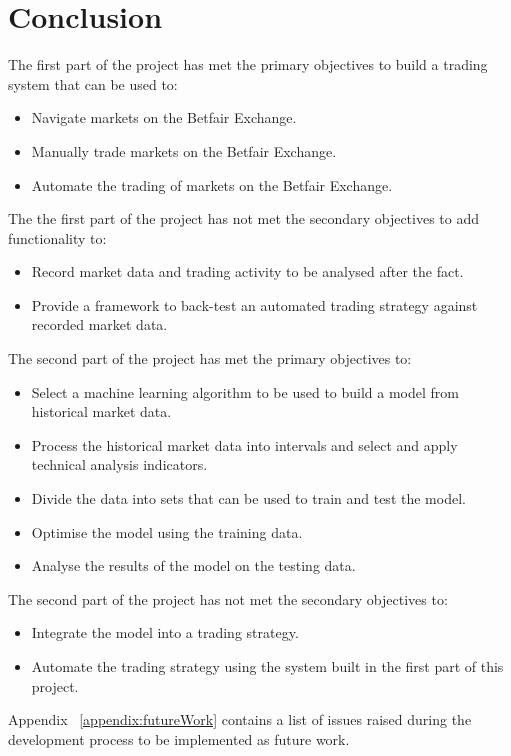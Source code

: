 \chapter{Conclusion}
	The first part of the project has met the primary objectives to build a trading system that can be used to:
	\begin{itemize}
		\item Navigate markets on the Betfair Exchange.
		\item Manually trade markets on the Betfair Exchange.
		\item Automate the trading of markets on the Betfair Exchange.
	\end{itemize}
	
	The the first part of the project has not met the secondary objectives to add functionality to:
	\begin{itemize}
		\item Record market data and trading activity to be analysed after the fact.
		\item Provide a framework to back-test an automated trading strategy against recorded market data.
	\end{itemize}


	The second part of the project has met the primary objectives to:
	\begin{itemize}
		\item Select a machine learning algorithm to be used to build a model from historical market data.
		\item Process the historical market data into intervals and select and apply technical analysis indicators.
		\item Divide the data into sets that can be used to train and test the model.
		\item Optimise the model using the training data.
		\item Analyse the results of the model on the testing data.
	\end{itemize}
	
	The second part of the project has not met the secondary objectives to:
	\begin{itemize}
		\item Integrate the model into a trading strategy.
		\item Automate the trading strategy using the system built in the first part of this project.
	\end{itemize}	
	
	Appendix ~\ref{appendix:futureWork} contains a list of issues raised during the development process to be implemented as future work.\\
	
